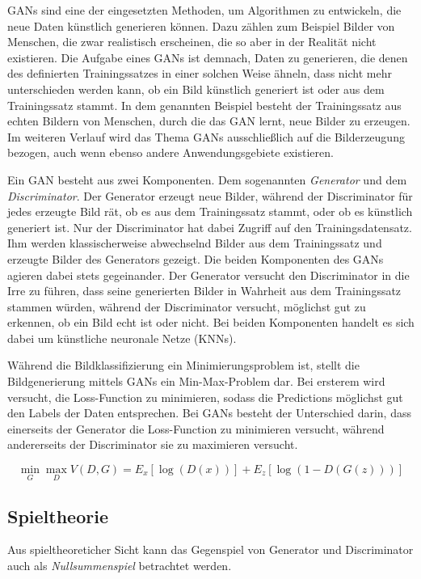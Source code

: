 \acp{GAN} sind eine der eingesetzten Methoden, um Algorithmen zu entwickeln, die neue Daten künstlich generieren können. Dazu zählen zum Beispiel Bilder von Menschen, die zwar realistisch erscheinen, die so aber in der Realität nicht existieren. Die Aufgabe eines \acp{GAN} ist demnach, Daten zu generieren, die denen des definierten Trainingssatzes in einer solchen Weise ähneln, dass nicht mehr unterschieden werden kann, ob ein Bild künstlich generiert ist oder aus dem Trainingssatz stammt. In dem genannten Beispiel besteht der Trainingssatz aus echten Bildern von Menschen, durch die das \ac{GAN} lernt, neue Bilder zu erzeugen. Im weiteren Verlauf wird das Thema \acp{GAN} ausschließlich auf die Bilderzeugung bezogen, auch wenn ebenso andere Anwendungsgebiete existieren. \cite{visualApproach}

Ein \ac{GAN} besteht aus zwei Komponenten. Dem sogenannten \emph{Generator} und dem \emph{Discriminator}. Der Generator erzeugt neue Bilder, während der Discriminator für jedes erzeugte Bild rät, ob es aus dem Trainingssatz stammt, oder ob es künstlich generiert ist. Nur der Discriminator hat dabei Zugriff auf den Trainingsdatensatz. Ihm werden klassischerweise abwechselnd Bilder aus dem Trainingssatz und erzeugte Bilder des Generators gezeigt. Die beiden Komponenten des \acp{GAN} agieren dabei stets gegeinander. Der Generator versucht den Discriminator in die Irre zu führen, dass seine generierten Bilder in Wahrheit aus dem Trainingssatz stammen würden, während der Discriminator versucht, möglichst gut zu erkennen, ob ein Bild echt ist oder nicht. Bei beiden Komponenten handelt es sich dabei um künstliche neuronale Netze (\acp{KNN}). \cite{visualApproach}

Während die Bildklassifizierung ein Minimierungsproblem ist, stellt die Bildgenerierung mittels \acp{GAN} ein Min-Max-Problem dar. Bei ersterem wird versucht, die Loss-Function zu minimieren, sodass die Predictions möglichst gut den Labels der Daten entsprechen. Bei \acp{GAN} besteht der Unterschied darin, dass einerseits der Generator die Loss-Function zu minimieren versucht, während andererseits der Discriminator sie zu maximieren versucht.

\begin{equation}
	\min_{G} \max_{D} V(D,G) = E_x[\log(D(x))] + E_z[\log(1-D(G(z)))]
\end{equation}

\subsection{Spieltheorie}
Aus spieltheoreticher Sicht kann das Gegenspiel von Generator und Discriminator auch als \emph{Nullsummenspiel} betrachtet werden.

